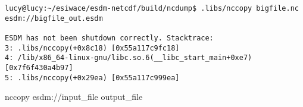 \begin{verbatim}
lucy@lucy:~/esiwace/esdm-netcdf/build/ncdump$ .libs/nccopy bigfile.nc esdm://bigfile_out.esdm

ESDM has not been shutdown correctly. Stacktrace:
3: .libs/nccopy(+0x8c18) [0x55a117c9fc18]
4: /lib/x86_64-linux-gnu/libc.so.6(__libc_start_main+0xe7) [0x7f6f430a4b97]
5: .libs/nccopy(+0x29ea) [0x55a117c999ea]
\end{verbatim}

nccopy esdm://input\_file output\_file

\begin{verbatim}


\end{verbatim}
